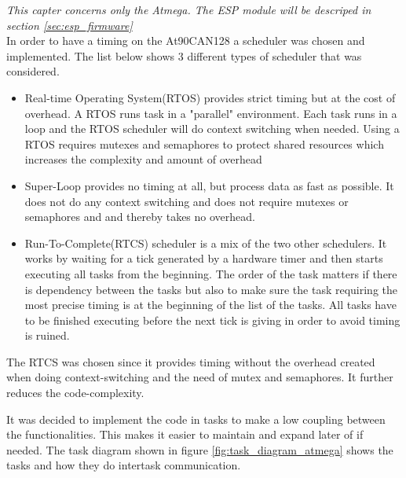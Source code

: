 \textit{This capter concerns only the Atmega.  The ESP module will be descriped in section \ref{sec:esp_firmware}} \\
In order to have a timing on the At90CAN128 a scheduler was chosen and implemented.
The list below shows 3 different types of scheduler that was considered.
\begin{itemize}
	\item Real-time Operating System(RTOS) provides strict timing but at the cost of overhead. A RTOS runs task in a "parallel" environment. Each task runs in a loop and the RTOS scheduler will do context switching when needed. Using a RTOS requires mutexes and semaphores to protect shared resources which increases the complexity and amount of overhead
	\item Super-Loop provides no timing at all, but process data as fast as possible. It does not do any context switching and does not require mutexes or semaphores and  and thereby takes no overhead.
	\item Run-To-Complete(RTCS) scheduler is a mix of the two other schedulers. It works by waiting for a tick generated by a hardware timer and then starts executing all tasks from the beginning. The order of the task matters if there is dependency between the tasks but also to make sure the task requiring the most precise timing is at the beginning of the list of the tasks. All tasks have to be finished executing before the next tick is giving in order to avoid timing is ruined.
\end{itemize}
The RTCS was chosen since it provides timing without the overhead created when doing context-switching and the need of mutex and semaphores. It further reduces the code-complexity.\\


It was decided to implement the code in tasks to make a low coupling between the functionalities. This makes it easier to maintain and expand later of if needed. The task diagram shown in figure \ref{fig:task_diagram_atmega} shows the tasks and how they do intertask communication.



